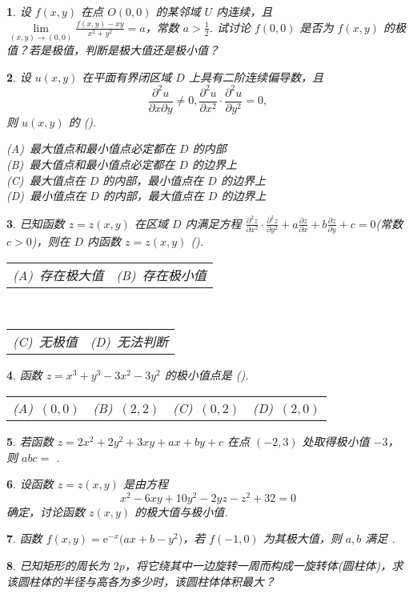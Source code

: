 \documentclass[openany,twocolumn]{ctexbook}
\makeatletter
\theoremstyle{change}
\newtheorem{ti}{}[section]
\def\htwo{ \uline{\hspace{\fill}}}
\def\kuo{ (\hspace{1pc})}
\newcommand{\fourch}[4]{\noindent\begin{tabular}{*{4}{@{}p{1.97cm}}}(A)~#1 & (B)~#2 & (C)~#3 & (D)~#4\end{tabular}} %
\newcommand{\twoch}[4]{\noindent\begin{tabular}{*{2}{@{}p{3.94cm}}}(A)~#1 & (B)~#2\end{tabular}\\\begin{tabular}{*{2}{@{}p{3.94cm}}}(C)~#3 & (D)~#4\end{tabular}}  %
\newcommand{\onech}[4]{\noindent(A)~#1 \\ (B)~#2 \\ (C)~#3 \\ (D)~#4}  %
\def\ee{\mathrm{e}}
\edef\lim{\lim\limits}
\makeatother
\begin{document}
	\begin{ti}
		设 $f(x,y)$ 在点 $O(0,0)$ 的某邻域 $U$ 内连续，且 $\lim_{(x,y) \to (0,0)} \frac{f(x,y) - xy}{x^{2} + y^{2}} = a$，常数 $a > \frac{1}{2}$. 试讨论 $f(0,0)$ 是否为 $f(x,y)$ 的极值？若是极值，判断是极大值还是极小值？
	\end{ti}

	\begin{ti}
		设 $u(x,y)$ 在平面有界闭区域 $D$ 上具有二阶连续偏导数，且
		\[
			\frac{\partial^{2}u}{\partial x \partial y} \ne 0,\frac{\partial^{2}u}{\partial x^{2}} \cdot \frac{\partial^{2}u}{\partial y^{2}} = 0,
		\]
		则 $u(x,y)$ 的\kuo.

		\onech{最大值点和最小值点必定都在 $D$ 的内部}{最大值点和最小值点必定都在 $D$ 的边界上}{最大值点在 $D$ 的内部，最小值点在 $D$ 的边界上}{最小值点在 $D$ 的内部，最大值点在 $D$ 的边界上}
	\end{ti}

	\begin{ti}
		已知函数 $z = z(x,y)$ 在区域 $D$ 内满足方程 $\frac{\partial^{2}z}{\partial x^{2}} \cdot \frac{\partial^{2}z}{\partial y^{2}} + a \frac{\partial z}{\partial x} + b \frac{\partial z}{\partial y} + c = 0$(常数 $c > 0$)，则在 $D$ 内函数 $z = z(x,y)$\kuo.

		\twoch{存在极大值}{存在极小值}{无极值}{无法判断}
	\end{ti}

	\begin{ti}
		函数 $z = x^{3} + y^{3} - 3x^{2} - 3y^{2}$ 的极小值点是\kuo.

		\fourch{$(0,0)$}{$(2,2)$}{$(0,2)$}{$(2,0)$}
	\end{ti}

	\begin{ti}
		若函数 $z = 2x^{2} + 2y^{2} + 3xy + ax + by + c$ 在点 $(-2,3)$ 处取得极小值 $-3$，则 $abc = $\htwo.
	\end{ti}

	\begin{ti}
		设函数 $z = z(x,y)$ 是由方程
		\[
			x^{2} - 6xy + 10y^{2} - 2yz - z^{2} + 32 = 0
		\]
		确定，讨论函数 $z(x,y)$ 的极大值与极小值.
	\end{ti}

	\begin{ti}
		函数 $f(x,y) = \ee^{-x} \bigl( ax + b - y^{2} \bigr)$，若 $f(-1,0)$ 为其极大值，则 $a,b$ 满足\htwo.
	\end{ti}

	\begin{ti}
		已知矩形的周长为 $2p$，将它绕其中一边旋转一周而构成一旋转体(圆柱体)，求该圆柱体的半径与高各为多少时，该圆柱体体积最大？
	\end{ti}
\end{document}
